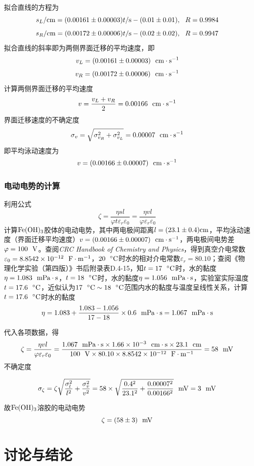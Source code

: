 \documentclass[12pt]{article}
\begin{document}
\par
拟合直线的方程为
$$
s_{L}/{\rm cm}=(0.00161\pm 0.00003)t/{\rm s}-(0.01\pm 0.01),\   \  R=0.9984
$$
$$
s_{R}/{\rm cm}=(0.00172\pm 0.00006)t/{\rm s}-(0.02\pm 0.02),\   \  R=0.9947
$$
拟合直线的斜率即为两侧界面迁移的平均速度，即
$$
v_{L}=(0.00161\pm 0.00003)\ \ {\rm cm\cdot s^{-1}}
$$
$$
v_{R}=(0.00172\pm 0.00006)\ \ {\rm cm\cdot s^{-1}}
$$
计算两侧界面迁移的平均速度
$$
v=\dfrac{v_{L}+v_{R}}{2}=0.00166\ \ {\rm cm\cdot s^{-1}}
$$
界面迁移速度的不确定度
$$
\sigma_{v}=\sqrt{\sigma_{v_{R}}^{2}+\sigma_{v_{L}}^{2}}=0.00007\ \ {\rm cm\cdot s^{-1}}
$$
即平均泳动速度为
$$
v=(0.00166\pm 0.00007)\ \ {\rm cm\cdot s^{-1}}
$$
\subsubsection{电动电势的计算}
利用公式
$$
\zeta=\frac{\eta s l}{\varphi t \varepsilon_{r} \varepsilon_{0}}=\frac{\eta v l}{\varphi  \varepsilon_{r} \varepsilon_{0}}
$$
计算$\rm Fe(OH)_{3}$胶体的电动电势，其中两电极间距离$l=(23.1\pm 0.4){\rm cm}$，平均泳动速度（界面迁移平均速度）$v=(0.00166\pm 0.00007)\ \ {\rm cm\cdot s^{-1}}$，两电极间电势差$\varphi=100\ \ {\rm V}$。查阅\textit{CRC Handbook of Chemistry and Physics}\citealp{crc}，得到真空介电常数$\varepsilon_{0}=8.8542\times 10^{-12}\ \ {\rm F\cdot m^{-1}}$，$20\ \ {\rm ^{\circ}C}$时水的相对介电常数$\varepsilon_{r}=80.10$；查阅《物理化学实验（第四版）》书后附录表D.4-15\citealp{textbook}，知$t=17\ \ {\rm ^{\circ}C}$时，水的黏度$\eta=1.083\ \ {\rm mPa\cdot s}$，$t=18\ \ {\rm ^{\circ}C}$时，水的黏度$\eta=1.056\ \ {\rm mPa\cdot s}$，实验室实际温度$t=17.6\ \ {\rm ^{\circ}C}$，近似认为$17\ \ {\rm ^{\circ}C\sim 18\ \ ^{\circ}C}$范围内水的黏度与温度呈线性关系，计算$t=17.6\ \ {\rm ^ {\circ}C}$时水的黏度
$$
\eta=1.083+\frac{1.083-1.056}{17-18}\times 0.6\ \ {\rm mPa\cdot s}=1.067\ \ {\rm mPa\cdot s}
$$
\par 
代入各项数据，得
$$
\zeta=\frac{\eta v l}{\varphi  \varepsilon_{r} \varepsilon_{0}}=\frac{1.067\ \ {\rm mPa\cdot s} \times 1.66\times 10^{-3}\ \ {\rm cm\cdot s} \times 23.1\ \ {\rm cm}}{100\ \ {\rm V}  \times 80.10 \times 8.8542\times 10^{-12}\ \ {\rm F\cdot m^{-1}}}=58\ \ {\rm mV}
$$
不确定度

$$
\sigma_{\zeta}=\zeta\sqrt{\frac{\sigma_{l}^{2}}{l^{2}}+\frac{\sigma_{v}^{2}}{v^{2}}}=58 \times \sqrt{\frac{0.4^{2}}{23.1^{2}}+\frac{0.00007^{2}}{0.00166^{2}}} \ \ {\rm mV}=3\ \ {\rm mV}
$$

故$\rm Fe(OH)_{3}$溶胶的电动电势
$$
\zeta=(58\pm 3) \ \ {\rm mV}
$$
\vbox{}
 	 \section{讨论与结论}
\end{document}
